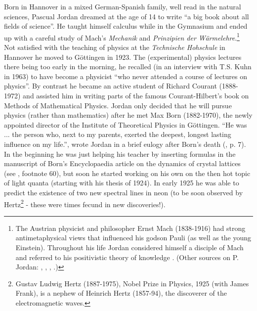 Born in Hannover in a mixed German-Spanish family, well read in the natural sciences,
Pascual Jordan dreamed at the age of 14 to write ``a big book about all fields of science''.
He taught himself calculus while in the Gymnasium and ended up with a careful study of Mach's
{\it Mechanik} and {\it Prinzipien der W\"armelehre}.\footnote{The Austrian physicist and philosopher Ernst Mach (1838-1916)
had strong antimetaphysical views that influenced his godson Pauli (as well as the young Einstein). Throughout his life 
Jordan considered himself a disciple of Mach and referred to his positivistic theory of knowledge \cite{Dar}. (Other
sources on P. Jordan: \cite{PJ07}, \cite{Sch99}, \cite{Me}, \cite{S06}.)} Not satisfied with the teaching of physics at the {\it
Technische Hohschule} in Hannover he moved to G\"ottingen in 1923. The (experimental) physics
lectures there being too early in the morning, he recalled (in an interview with
T.S. Kuhn in 1963) to have become a physicist ``who never attended a course of lectures on physics''.
By contrast he became an active student of Richard Courant (1888-1972) and assisted him in writing
parts of the famous Courant-Hilbert's book on Methods of Mathematical Physics. Jordan only decided
that he will pursue physics (rather than mathematics) after he met Max Born (1882-1970), the newly
appointed director of the Institute of Theoretical Physics in G\"ottingen. ``He was ... the
person who, next to my parents, exerted the deepest, longest lasting influence on my life.'',
wrote Jordan in a brief eulogy after Born's death (\cite {Sch}, p. 7). In the beginning he
was just helping his teacher by inserting formulas in the manuscript of Born's Encyclopaedia article on the dynamics of crystal lattices (see \cite{MR}, footnote 60), but soon he started working on his own on the then hot topic of light quanta (starting with his thesis of 1924).
In early 1925 he was able to predict the existence of two new spectral lines in neon (to be soon observed by Hertz\footnote{Gustav Ludwig 
Hertz (1887-1975), Nobel Prize in Physics, 1925 (with James Frank), is a nephew of Heinrich Hertz (1857-94), the discoverer of the
electromagnetic waves.} - these were times fecund in new discoveries!). 


